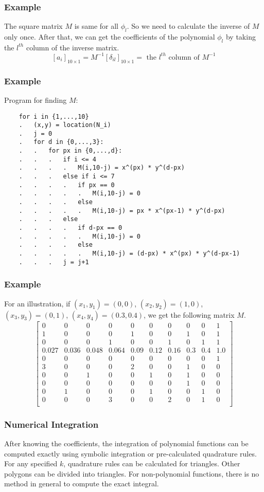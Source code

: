 \documentclass{beamer}
\begin{document}
\begin{frame}
\frametitle{Example}
The square matrix $M$ is same for all $\phi_l$.
	So we need to calculate the inverse of $M$ only once. After that, we can get the coefficients of the polynomial $\phi_l$ by taking the $l^{th}$ column of the inverse matrix.
	$$
	[a_i]_{10\times 1}=M^{-1} [\delta_{il}]_{10\times 1}=\mbox{ the }l^{th}\mbox{ column of }M^{-1}
	$$
\end{frame}
\begin{frame}[fragile]
\frametitle{Example}
Program for finding $M$:

	\begin{lstlisting}
	for i in {1,...,10}
	.	(x,y) = location(N_i)
	.	j = 0
	.	for d in {0,...,3}:
	.	.	for px in {0,...,d}:
	.	.	.	if i <= 4
	.	.	.	.	M(i,10-j) = x^(px) * y^(d-px)
	.	.	.	else if i <= 7
	.	.	.	.	if px == 0
	.	.	.	.	.	M(i,10-j) = 0
	.	.	.	.	else
	.	.	.	.	.	M(i,10-j) = px * x^(px-1) * y^(d-px)
	.	.	.	else
	.	.	.	.	if d-px == 0
	.	.	.	.	.	M(i,10-j) = 0
	.	.	.	.	else
	.	.	.	.	.	M(i,10-j) = (d-px) * x^(px) * y^(d-px-1)
	.	.	.	j = j+1
\end{lstlisting}
	
\end{frame}
\begin{frame}
\frametitle{Example}
For an illustration, if $(x_1,y_1)=(0,0)$, $(x_2,y_2)=(1,0)$, $(x_3,y_3)=(0,1)$, $(x_4,y_4)=(0.3,0.4)$, we get the following matrix $M$.
	$$
	\begin{bmatrix}
	0 & 0 & 0 & 0 & 0 & 0 & 0 & 0 & 0 & 1 \\
	1 & 0 & 0 & 0 & 1 & 0 & 0 & 1 & 0 & 1 \\
	0 & 0 & 0 & 1 & 0 & 0 & 1 & 0 & 1 & 1 \\
	0.027 & 0.036 & 0.048 & 0.064 & 0.09 & 0.12 & 0.16 & 0.3 & 0.4 & 1.0 \\
	0 & 0 & 0 & 0 & 0 & 0 & 0 & 0 & 0 & 1 \\
	3 & 0 & 0 & 0 & 2 & 0 & 0 & 1 & 0 & 0  \\
	0 & 0 & 1 & 0 & 0 & 1 & 0 & 1 & 0 & 0  \\
	0 & 0 & 0 & 0 & 0 & 0 & 0 & 1 & 0 & 0  \\
	0 & 1 & 0 & 0 & 0 & 1 & 0 & 0 & 1 & 0  \\
	0 & 0 & 0 & 3 & 0 & 0 & 2 & 0 & 1 & 0  \\
	\end{bmatrix}
	$$
	
\end{frame}

\begin{frame}
\frametitle{Numerical Integration}
After knowing the coefficients, the integration of polynomial functions can be computed exactly using symbolic integration or pre-calculated quadrature rules.
\linebreak\linebreak
For any specified $k$, quadrature rules can be calculated for triangles. Other polygons can be divided into triangles.
\linebreak\linebreak
For non-polynomial functions, there is no method in general to compute the exact integral.
\end{frame}
\end{document}
